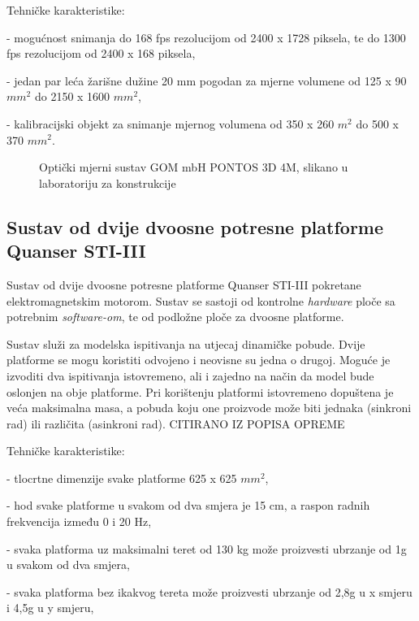 \documentclass[12pt]{book}
\begin{document}
Tehničke karakteristike:

- mogućnost snimanja do 168 fps rezolucijom od 2400 x 1728 piksela, te do 1300 fps rezolucijom od 2400 x 168 piksela,

- jedan par leća žarišne dužine 20 mm pogodan za mjerne volumene od 125 x 90 $mm^2$ do 2150 x 1600 $mm^2$,

- kalibracijski objekt za snimanje mjernog volumena od 350 x 260 $m^2$ do 500 x 370 $mm^2$.

\begin{figure}[h]
	\centering
	\caption{Optički mjerni sustav GOM mbH PONTOS 3D 4M, slikano u laboratoriju za konstrukcije}
	\label{fig:whatsapp-image-2023-08-23-at-13}
\end{figure}

\newpage

\subsection{Sustav od dvije dvoosne potresne platforme Quanser STI-III}

Sustav od dvije dvoosne potresne platforme Quanser STI-III pokretane elektromagnetskim motorom. Sustav se sastoji od kontrolne \textit{hardware} ploče sa potrebnim \textit{software-om}, te od podložne ploče za dvoosne platforme.

Sustav služi za modelska ispitivanja na utjecaj dinamičke pobude. Dvije platforme se mogu koristiti odvojeno i neovisne su jedna o drugoj. Moguće je izvoditi dva ispitivanja istovremeno, ali i zajedno na način da model bude oslonjen na obje platforme. Pri korištenju platformi istovremeno dopuštena je veća maksimalna masa, a pobuda koju one proizvode može biti jednaka (sinkroni rad) ili različita (asinkroni rad). CITIRANO IZ POPISA OPREME

\newpage

Tehničke karakteristike:

- tlocrtne dimenzije svake platforme 625 x 625 $mm^2$,

- hod svake platforme u svakom od dva smjera je 15 cm, a raspon radnih frekvencija između 0 i 20 Hz,

- svaka platforma uz maksimalni teret od 130 kg može proizvesti ubrzanje od 1g u svakom od dva smjera,

- svaka platforma bez ikakvog tereta može proizvesti ubrzanje od 2,8g u x smjeru i 4,5g u y smjeru,
\end{document}
